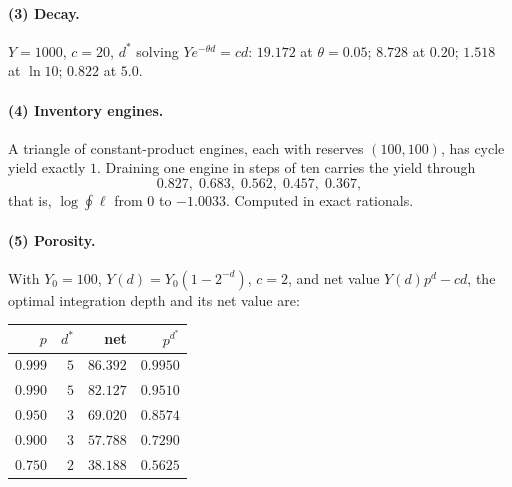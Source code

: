 \documentclass[11pt]{article}
\theoremstyle{plain}
\theoremstyle{definition}
\theoremstyle{remark}
\begin{document}
\paragraph{(3) Decay.} $Y = 1000$, $c = 20$, $d^\ast$ solving
$Ye^{-\theta d} = cd$: $19.172$ at $\theta = 0.05$; $8.728$ at $0.20$;
$1.518$ at $\ln 10$; $0.822$ at $5.0$.

\paragraph{(4) Inventory engines.} A triangle of constant-product engines,
each with reserves $(100,100)$, has cycle yield exactly $1$. Draining one
engine in steps of ten carries the yield through
\[
  0.827,\; 0.683,\; 0.562,\; 0.457,\; 0.367,
\]
that is, $\log \oint \ell$ from $0$ to $-1.0033$. Computed in exact
rationals.

\paragraph{(5) Porosity.} With $Y_0 = 100$, $Y(d) = Y_0(1-2^{-d})$,
$c = 2$, and net value $Y(d)p^d - cd$, the optimal integration depth and
its net value are:

\begin{center}\small
\begin{tabular}{@{}rrrr@{}}
\toprule
$p$ & $d^\ast$ & net & $p^{d^\ast}$ \\
\midrule
$0.999$ & $5$ & $86.392$ & $0.9950$ \\
$0.990$ & $5$ & $82.127$ & $0.9510$ \\
$0.950$ & $3$ & $69.020$ & $0.8574$ \\
$0.900$ & $3$ & $57.788$ & $0.7290$ \\
$0.750$ & $2$ & $38.188$ & $0.5625$ \\
\bottomrule
\end{tabular}
\end{center}
\end{document}
